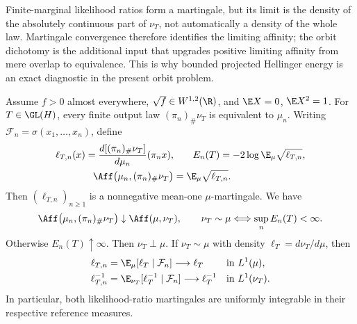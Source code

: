 Finite-marginal likelihood ratios form a martingale, but its limit is the
density of the absolutely continuous part of \(\nu_T\), not automatically a
density of the whole law.  Martingale convergence therefore identifies the
limiting affinity; the orbit dichotomy is the additional input that upgrades
positive limiting affinity from mere overlap to equivalence.  This is why
bounded projected Hellinger energy is an exact diagnostic in the present orbit
problem.

\begin{lemma}
\label{lem:finite-marginal-likelihood-ratios}
Assume \(f>0\) almost everywhere, \(\sqrt f\in W^{1,2}(\R)\),
and \(\E X=0\), \(\E X^2=1\).
For \(T\in\GL(H)\), every finite output law
\((\pi_n)_\#\nu_T\) is equivalent to \(\mu_n\).
Writing \(\mathcal F_n=\sigma(x_1,\ldots,x_n)\), define
\begin{equation}
 \begin{aligned}
  \ell_{T,n}(x)=\frac{d[(\pi_n)_\#\nu_T]}{d\mu_n}(\pi_n x),
  &\qquad E_n(T)=-2\log\E_\mu\sqrt{\ell_{T,n}},\\
  \Aff\bigl(\mu_n,(\pi_n)_\#\nu_T\bigr)
  &=\E_\mu\sqrt{\ell_{T,n}}.
 \end{aligned}
  \label{eq:finite-marginal-likelihood-ratios}
\end{equation}
Then \((\ell_{T,n})_{n\geq1}\) is a nonnegative mean-one
\(\mu\)-martingale.
We have
\begin{equation}
  \Aff\bigl(\mu_n,(\pi_n)_\#\nu_T\bigr)\downarrow\Aff(\mu,\nu_T),
  \qquad
  \nu_T\sim\mu
    \Longleftrightarrow\sup_nE_n(T)<\infty.
  \label{eq:marginal-affinity-limit}
\end{equation}
Otherwise \(E_n(T)\uparrow\infty\).
Then \(\nu_T\perp\mu\).
If \(\nu_T\sim\mu\) with density
\(\ell_T=d\nu_T/d\mu\), then
\begin{align}
  \ell_{T,n}&=\E_\mu[\ell_T\mid\mathcal F_n]
       \longrightarrow \ell_T
       &&\text{in }L^1(\mu),
       \label{eq:forward-likelihood-ui}\\
  \ell_{T,n}^{-1}&=\E_{\nu_T}[\ell_T^{-1}\mid\mathcal F_n]
       \longrightarrow \ell_T^{-1}
       &&\text{in }L^1(\nu_T).
       \label{eq:reverse-likelihood-ui}
\end{align}
In particular, both likelihood-ratio martingales are uniformly integrable in
their respective reference measures.
\end{lemma}

